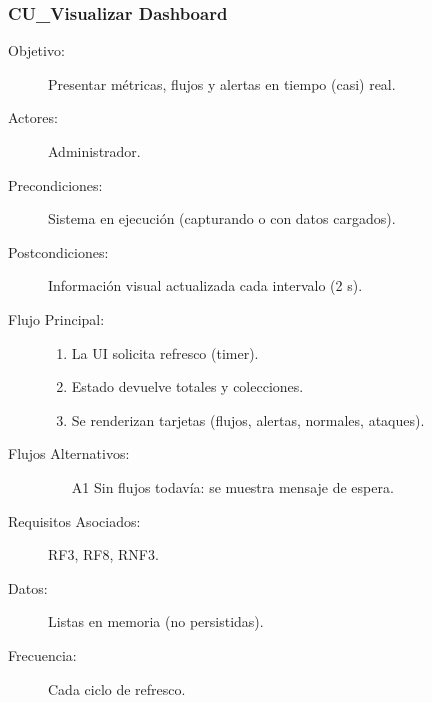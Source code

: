 \subsubsection{CU\_Visualizar Dashboard}
\begin{description}
  \item[Objetivo:] Presentar métricas, flujos y alertas en tiempo (casi) real.
  \item[Actores:] Administrador.
  \item[Precondiciones:] Sistema en ejecución (capturando o con datos cargados).
  \item[Postcondiciones:] Información visual actualizada cada intervalo (2 s).
  \item[Flujo Principal:]
    \begin{enumerate}
      \item La UI solicita refresco (timer).
      \item Estado devuelve totales y colecciones.
      \item Se renderizan tarjetas (flujos, alertas, normales, ataques).
    \end{enumerate}
  \item[Flujos Alternativos:]
    \begin{enumerate}
      \item[A1] Sin flujos todavía: se muestra mensaje de espera.
    \end{enumerate}
  \item[Requisitos Asociados:] RF3, RF8, RNF3.
  \item[Datos:] Listas en memoria (no persistidas).
  \item[Frecuencia:] Cada ciclo de refresco.
\end{description}

